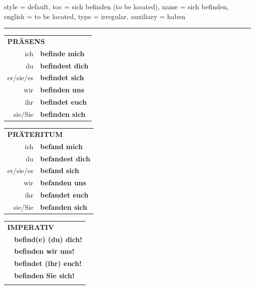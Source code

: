 \begin{verbentry}{
  style = {default},
  toc = {sich befinden (to be located)},
  name = {sich befinden},
  english = {to be located},
  type = {irregular},
  auxiliary = {haben}
}
 
    
       \vspace{5pt}

    \hrule
    
    \vspace{5pt}

  \begin{tabular}{rl}
     \multicolumn{2}{l}{\textbf{PRÄSENS} }\\
    ich & \textbf{befinde mich}\\
    du & \textbf{befindest dich}\\
    er/sie/es & \textbf{befindet sich}\\
    wir & \textbf{befinden uns}\\
    ihr & \textbf{befindet euch}\\
    sie/Sie & \textbf{befinden sich}\\
  \end{tabular}
  \hfill
     \begin{tabular}{rl}
    \multicolumn{2}{l}{\textbf{PRÄTERITUM} }\\
    ich & \textbf{befand mich}\\
    du & \textbf{befandest dich}\\
    er/sie/es & \textbf{befand sich}\\
    wir & \textbf{befanden uns}\\
    ihr & \textbf{befandet euch}\\
    sie/Sie & \textbf{befanden sich}\\
  \end{tabular}
  \hfill
  \begin{tabular}{rl}
     \multicolumn{2}{l}{\textbf{IMPERATIV} }\\
   & \textbf{befind(e) (du) dich!}\\
   & \textbf{befinden wir uns!}\\
   & \textbf{befindet (ihr) euch!}\\
   & \textbf{befinden Sie sich!}\\
   & \vspace{10pt}
  \end{tabular}

    \vspace{10pt}


\end{verbentry}
